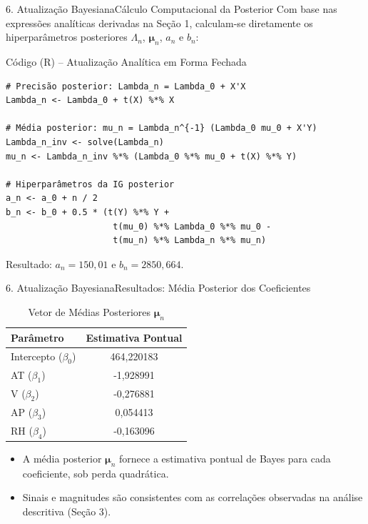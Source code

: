 \documentclass[10pt,aspectratio=169]{beamer}
\begin{document}
\begin{frame}[fragile]{6. Atualização Bayesiana}{Cálculo Computacional da Posterior}
    Com base nas expressões analíticas derivadas na Seção 1, calculam-se diretamente os hiperparâmetros posteriores $\Lambda_n$, $\boldsymbol{\mu}_n$, $a_n$ e $b_n$:
    \begin{block}{Código (R) -- Atualização Analítica em Forma Fechada}
\begin{verbatim}
# Precisão posterior: Lambda_n = Lambda_0 + X'X
Lambda_n <- Lambda_0 + t(X) %*% X

# Média posterior: mu_n = Lambda_n^{-1} (Lambda_0 mu_0 + X'Y)
Lambda_n_inv <- solve(Lambda_n)
mu_n <- Lambda_n_inv %*% (Lambda_0 %*% mu_0 + t(X) %*% Y)

# Hiperparâmetros da IG posterior
a_n <- a_0 + n / 2
b_n <- b_0 + 0.5 * (t(Y) %*% Y +
                     t(mu_0) %*% Lambda_0 %*% mu_0 -
                     t(mu_n) %*% Lambda_n %*% mu_n)
\end{verbatim}
    \end{block}
    Resultado: $a_n = 150,01$ e $b_n = 2850,664$.
\end{frame}

\begin{frame}{6. Atualização Bayesiana}{Resultados: Média Posterior dos Coeficientes}
    \begin{table}
        \centering
        \caption{Vetor de Médias Posteriores $\boldsymbol{\mu}_n$}
        \small
        \begin{tabular}{lc}
            \toprule
            \textbf{Parâmetro} & \textbf{Estimativa Pontual} \\
            \midrule
            Intercepto ($\beta_0$) & 464,220183 \\
            AT ($\beta_1$)         & -1,928991  \\
            V ($\beta_2$)          & -0,276881  \\
            AP ($\beta_3$)         & 0,054413   \\
            RH ($\beta_4$)         & -0,163096  \\
            \bottomrule
        \end{tabular}
    \end{table}
    \begin{itemize}
        \item A média posterior $\boldsymbol{\mu}_n$ fornece a estimativa pontual de Bayes para cada coeficiente, sob perda quadrática.
        \item Sinais e magnitudes são consistentes com as correlações observadas na análise descritiva (Seção 3).
    \end{itemize}
\end{frame}
\end{document}
